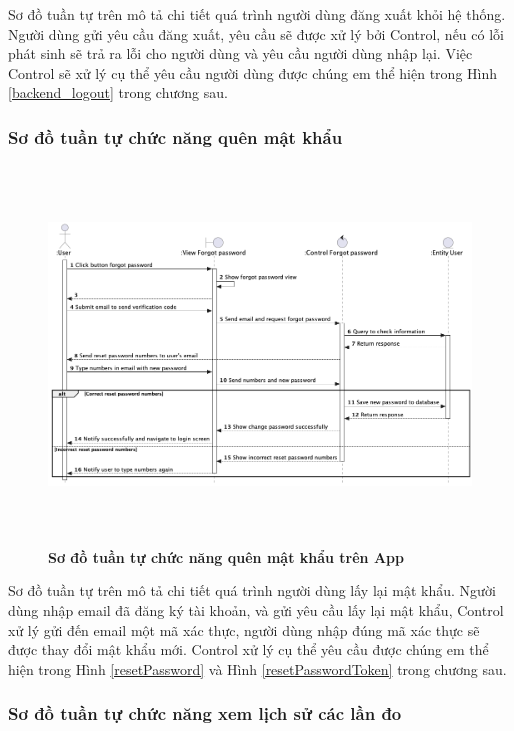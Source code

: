 Sơ đồ tuần tự trên mô tả chi tiết quá trình người dùng đăng xuất khỏi hệ thống. Người dùng gửi yêu cầu đăng xuất, yêu cầu sẽ
được xử lý bởi Control, nếu có lỗi phát sinh sẽ trả ra lỗi cho người dùng và yêu cầu người dùng nhập lại. Việc Control
sẽ xử lý cụ thể yêu cầu người dùng được chúng em thể hiện trong Hình \ref{backend_logout} trong chương sau.


\subsubsection{Sơ đồ tuần tự chức năng quên mật khẩu}

  \begin{figure}[H]
        \centering
        \includegraphics[width=12.9cm,height=10cm]{Images/mobile_app/forgot_password.png}
        \caption[Sơ đồ tuần tự chức năng quên mật khẩu trên App]{\bfseries \fontsize{12pt}{0pt}
        \selectfont Sơ đồ tuần tự chức năng quên mật khẩu trên App}
        \label{forgot_password} %
  \end{figure}

  Sơ đồ tuần tự trên mô tả chi tiết quá trình người dùng lấy lại mật khẩu. Người dùng nhập email đã đăng ký tài khoản,
  và gửi yêu cầu lấy lại mật khẩu, Control xử lý gửi đến email một mã xác thực, người dùng nhập đúng mã xác thực sẽ được thay
  đổi mật khẩu mới. Control xử lý cụ thể yêu cầu được chúng em thể hiện trong Hình \ref{resetPassword} và Hình \ref{resetPasswordToken} trong chương sau.

\subsubsection{Sơ đồ tuần tự chức năng xem lịch sử các lần đo}

